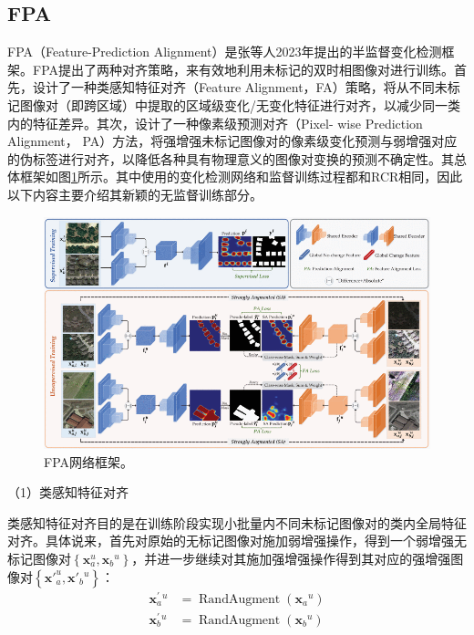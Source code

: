 \documentclass[lang=chs, degree=master, blindreview=false, adobe=false]{yanputhesis}
\begin{document}
\subsection{FPA}
FPA（Feature-Prediction Alignment）是张等人\cite{Zhang2023FPA}2023年提出的半监督变化检测框架。FPA提出了两种对齐策略，来有效地利用未标记的双时相图像对进行训练。首先，设计了一种类感知特征对齐（Feature Alignment，FA）策略，将从不同未标记图像对（即跨区域）中提取的区域级变化/无变化特征进行对齐，以减少同一类内的特征差异。其次，设计了一种像素级预测对齐（Pixel- wise Prediction Alignment， PA）方法，将强增强未标记图像对的像素级变化预测与弱增强对应的伪标签进行对齐，以降低各种具有物理意义的图像对变换的预测不确定性。其总体框架如图\ref{fig:FPAfram}所示。其中使用的变化检测网络和监督训练过程都和RCR\cite{bandara2022RCR}相同，因此以下内容主要介绍其新颖的无监督训练部分。
\begin{figure}[htb]
  \centering
  \includegraphics[scale=0.55]{images/FPAframe.png}
  \caption{
    FPA网络框架\cite{Zhang2023FPA}。
  }
  \label{fig:FPAfram}
\end{figure}

（1）类感知特征对齐

类感知特征对齐目的是在训练阶段实现小批量内不同未标记图像对的类内全局特征对齐。具体说来，首先对原始的无标记图像对施加弱增强操作，得到一个弱增强无标记图像对$\left\{\mathbf{x}_{a}^{u}, \mathbf{x}_{b}{ }^{u}\right\}$，并进一步继续对其施加强增强操作得到其对应的强增强图像对$\left\{\mathbf{x'}_{a}^{u}, \mathbf{x'}_{b}{ }^{u}\right\}$：
\begin{equation}
  \label{eq:FPAaug}
  \begin{aligned}
    \mathbf{x}_{a}^{\prime}{ }^{u} & =\operatorname{RandAugment}\left(\mathbf{x}_{a}{ }^{u}\right) \\
    \mathbf{x}_{b}^{\prime}{ }^{u} & =\operatorname{RandAugment}\left(\mathbf{x}_{b}{ }^{u}\right)
  \end{aligned}
\end{equation}
\end{document}
